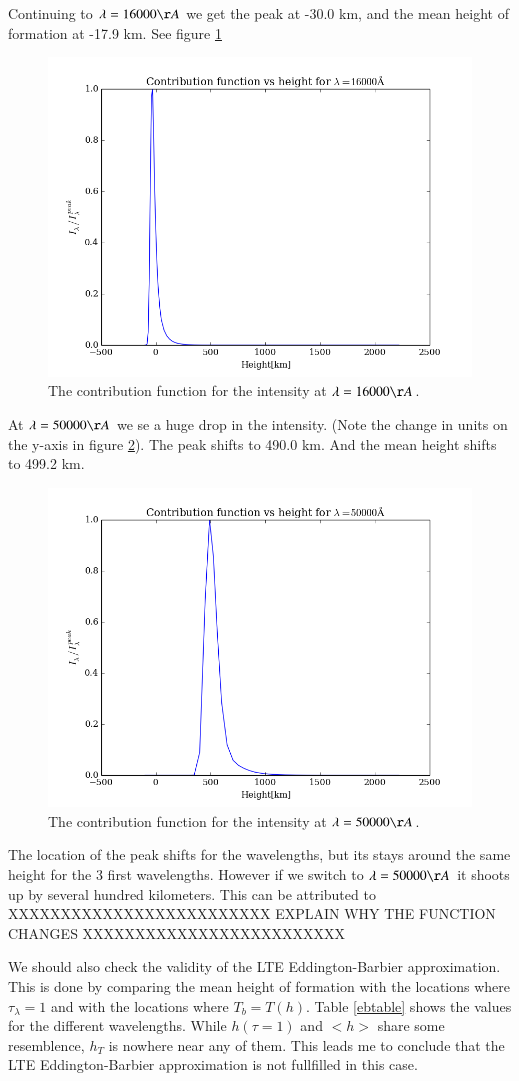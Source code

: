 \documentclass{aa}   %
\begin{document}
Continuing to $\lambda = 16000\AA$ we get the peak at -30.0 km, and the mean height of formation at -17.9 km. See figure \ref{contfunc_16000}

\begin{figure}
 \includegraphics[width=.49\textwidth]{contfunc_16000.png}
 \caption{The contribution function for the intensity at $\lambda= 16000\AA$.}
 \label{contfunc_16000}
\end{figure}

At $\lambda = 50000\AA$ we se a huge drop in the intensity. (Note the change in units on the y-axis in figure \ref{contfunc_50000}). The peak shifts to 490.0 km. And the mean height shifts to 499.2 km.

\begin{figure}
 \includegraphics[width=.49\textwidth]{contfunc_50000.png}
 \caption{The contribution function for the intensity at $\lambda= 50000\AA$.}
 \label{contfunc_50000}
\end{figure}


The location of the peak shifts for the wavelengths, but its stays around the same height for the 3 first wavelengths. However if we switch to $\lambda = 50000 \AA$ it shoots up by several hundred kilometers. This can be attributed to XXXXXXXXXXXXXXXXXXXXXXXXX EXPLAIN WHY THE FUNCTION CHANGES XXXXXXXXXXXXXXXXXXXXXXXXX

We should also check the validity of the LTE Eddington-Barbier approximation. This is done by comparing the mean height of formation with the locations where $\tau_\lambda = 1$ and with the locations where $T_b = T(h)$.
Table \ref{ebtable} shows the values for the different wavelengths. While $h(\tau=1)$ and $<h>$ share some resemblence, $h_T$ is nowhere near any of them. This leads me to conclude that the LTE Eddington-Barbier approximation is not fullfilled in this case.
\end{document}
